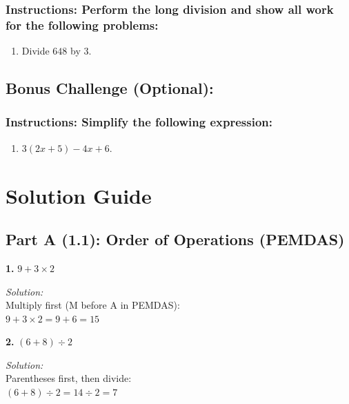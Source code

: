 \documentclass[12pt]{article}
\begin{document}
            \subsubsection*{Instructions: Perform the long division and show all work for the following problems:}

                \begin{enumerate}
                    \item Divide $648$ by $3$.
                \end{enumerate}

        \subsection*{Bonus Challenge (Optional):}

            \subsubsection*{Instructions: Simplify the following expression:}

                \begin{enumerate}
                    \item $3(2x + 5) - 4x + 6$.
                \end{enumerate}

                \newpage

    \section*{Solution Guide}

        \subsection*{Part A (1.1): Order of Operations (PEMDAS)}

            \textbf{1.} $9 + 3 \times 2$

                \textit{Solution:}\\
                Multiply first (M before A in PEMDAS):\\
                $9 + 3 \times 2 = 9 + 6 = 15$


                \vspace{0.5cm}

            \textbf{2.} $(6 + 8) \div 2$

                \textit{Solution:}\\
                Parentheses first, then divide:\\
                $(6 + 8) \div 2 = 14 \div 2 = 7$
\end{document}
